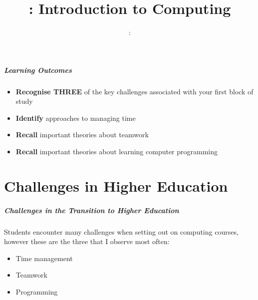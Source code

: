 \usepackage{../../beamerthemeFalmouthGamesAcademy}
\usepackage{multimedia}
\graphicspath{ {../../} }

\usepackage{textcomp}


\usepackage[normalem]{ulem}
\usepackage{wasysym}
\usepackage{pdfpages}
\usepackage{epstopdf} %

\usetikzlibrary{arrows,automata}







\title{\sessionnumber: Introduction to Computing}
\subtitle{\modulecode: \moduletitle}

\frame{\titlepage} 

\begin{frame}
	\frametitle{Learning Outcomes}
	\begin{itemize}
		\item \textbf{Recognise THREE} of the key challenges associated with your first block of study
		\item \textbf{Identify} approaches to managing time
		\item \textbf{Recall} important theories about teamwork
		\item \textbf{Recall} important theories about learning computer programming
	\end{itemize}
\end{frame}


\part{Challenges in Higher Education}
\frame{\partpage}

\begin{frame}
	\frametitle{Challenges in the Transition to Higher Education}
	
	Students encounter many challenges when setting out on computing courses, however these are the three that I observe most often:
	
	\begin{itemize}
		\item Time management
		\item Teamwork
		\item Programming
	\end{itemize}
\end{frame}

